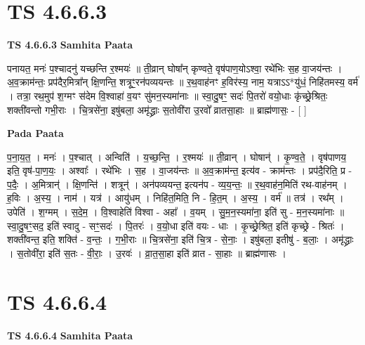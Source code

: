 \documentclass[17pt]{extarticle}
\begin{document}

\section{ TS 4.6.6.3 }

\textbf{TS 4.6.6.3 } \newline
\textbf{Samhita Paata} \newline

पनायत॒ मनः॑ प॒श्चादनु॑ यच्छन्ति र॒श्मयः॑ ॥ ती॒व्रान् घोषा᳚न् कृण्वते॒ वृष॑पाण॒योऽश्वा॒ रथे॑भिः स॒ह वा॒जय॑न्तः । अ॒व॒क्राम॑न्तः॒ प्रप॑दैर॒मित्रा᳚न् क्षि॒णन्ति॒ शत्रूꣳ॒॒रन॑पव्ययन्तः ॥ र॒थ॒वाह॑नꣳ ह॒विर॑स्य॒ नाम॒ यत्राऽऽ*यु॑धं॒ निहि॑तमस्य॒ वर्म॑ । तत्रा॒ रथ॒मुप॑ श॒ग्मꣳ स॑देम वि॒श्वाहा॑ व॒यꣳ सु॑मन॒स्यमा॑नाः ॥ स्वा॒दु॒षꣳ॒॒ सदः॑ पि॒तरो॑ वयो॒धाः कृ॑च्छ्रे॒श्रितः॒ शक्ती॑वन्तो गभी॒राः । चि॒त्रसे॑ना॒ इषु॑बला॒ अमृ॑द्ध्राः स॒तोवी॑रा उ॒रवो᳚ व्रातसा॒हाः ॥ ब्राह्म॑णासः॒ - [  ] \newline

\textbf{Pada Paata} \newline

प॒ना॒य॒त॒ । मनः॑ । प॒श्चात् । अन्विति॑ । य॒च्छ॒न्ति॒ । र॒श्मयः॑ ॥ ती॒व्रान् । घोषान्॑ । कृ॒ण्व॒ते॒ । वृष॑पाणय॒ इति॒ वृष॑-पा॒ण॒यः॒ । अश्वाः᳚ । रथे॑भिः । स॒ह । वा॒जय॑न्तः ॥ अ॒व॒क्राम॑न्त॒ इत्य॑व - क्राम॑न्तः । प्रप॑दै॒रिति॒ प्र - प॒दैः॒ । अ॒मित्रान्॑ । क्षि॒णन्ति॑ । शत्रून्॑ । अन॑पव्ययन्त॒ इत्यन॑प - व्य॒य॒न्तः॒ ॥ र॒थ॒वाह॑न॒मिति॑ रथ-वाह॑नम् । ह॒विः । अ॒स्य॒ । नाम॑ । यत्र॑ । आयु॑धम् । निहि॑त॒मिति॒ नि - हि॒त॒म् । अ॒स्य॒ । वर्म॑ ॥ तत्र॑ । रथ᳚म् । उपेति॑ । श॒ग्मम् । स॒दे॒म॒ । वि॒श्वाहेति॑ विश्वा - अहा᳚ । व॒यम् । सु॒म॒न॒स्यमा॑ना॒ इति॑ सु - म॒न॒स्यमा॑नाः ॥ स्वा॒दु॒षꣳ॒॒सद॒ इति॑ स्वादु - सꣳ॒॒सदः॑ । पि॒तरः॑ । व॒यो॒धा इति॑ वयः - धाः । कृ॒च्छ्रे॒श्रित॒ इति॑ कृच्छ्रे - श्रितः॑ । शक्ती॑वन्त॒ इति॒ शक्ति॑ - व॒न्तः॒ । ग॒भी॒राः ॥ चि॒त्रसे॑ना॒ इति॑ चि॒त्र - से॒नाः॒ । इषु॑बला॒ इतीषु॑ - ब॒लाः॒ । अमृ॑द्ध्राः । स॒तोवी॑रा॒ इति॑ स॒तः - वी॒राः॒ । उ॒रवः॑ । व्रा॒त॒सा॒हा इति॑ व्रात - सा॒हाः ॥ ब्राह्म॑णासः ।  \newline





\section{ TS 4.6.6.4 }

\textbf{TS 4.6.6.4 } \newline
\textbf{Samhita Paata} \newline
\end{document}

